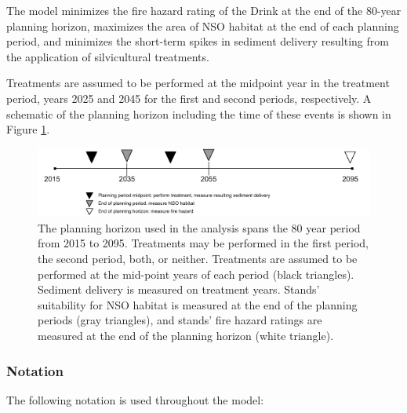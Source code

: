 The model minimizes the fire hazard rating of the Drink at the end of the 80-year planning horizon, maximizes the area of NSO habitat at the end of each planning period, and minimizes the short-term spikes in sediment delivery resulting from the application of silvicultural treatments.

Treatments are assumed to be performed at the midpoint year in the treatment period, years 2025 and 2045 for the first and second periods, respectively. A schematic of the planning horizon including the time of these events is shown in Figure \ref{fig:drinkPlanningHorizon}.

\begin{figure}
\centering
\includegraphics[width=.85\textwidth]{../images/Drink_PlanningHorizon_Sketch}
\caption[Planning horizon schematic]{The planning horizon used in the analysis spans the 80 year period from 2015 to 2095. Treatments may be performed in the first period, the second period, both, or neither. Treatments are assumed to be performed at the mid-point years of each period (black triangles). Sediment delivery is measured on treatment years. Stands' suitability for NSO habitat is measured at the end of the planning periods (gray triangles), and stands' fire hazard ratings are measured at the end of the planning horizon (white triangle).}
\label{fig:drinkPlanningHorizon}
\end{figure}

\subsubsection{Notation}
The following notation is used throughout the model:
